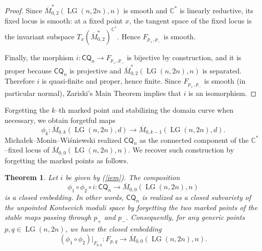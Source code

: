 \documentclass[10pt]{amsart}
\newtheorem{theorem}{Theorem}[section]
\theoremstyle{definition}
\newcommand{\C}{\mathbb{C}}
\newcommand{\Mbar}{\overline{M}}
\newcommand{\LG}{\operatorname{LG}}
\newcommand{\CQ}{\mathsf{CQ}}
\theoremstyle{plain} %
\begin{document}
\begin{proof}
Since $\overline{M}_{0,2}^*(\LG(n,2n), n)$ is smooth and $\C^*$ is linearly reductive, its fixed locus is smooth: at a fixed point $x$, the tangent space of the fixed locus is the invariant subspace $T_x(\overline{M}_{0,2}^*)^{\C^*}$.
Hence $F_{p_{+},p_{-}}$ is smooth.

Finally, the morphism $i\colon\CQ_n\to F_{p_{+},p_{-}}$ is bijective by construction, and it is proper because $\CQ_n$ is projective and $\overline{M}_{0,2}^*(\LG(n,2n), n)$ is separated.
Therefore $i$ is quasi-finite and proper, hence finite.
Since $F_{p_{+},p_{-}}$ is smooth (in particular normal), Zariski's Main Theorem implies that $i$ is an isomorphism.

\end{proof}



Forgetting the $k$--th marked point and stabilizing the domain curve when necessary, we obtain forgetful maps
\[
\phi_k \colon \Mbar_{0,k}(\LG(n,2n),d) \longrightarrow \Mbar_{0,k-1}(\LG(n,2n),d).
\]
Micha{\l}ek--Monin--Wi\'sniewski \cite[Corollary 3.11]{MMW21} realized $\CQ_n$
as the connected component of the $\mathbb C^*$--fixed locus of $\Mbar_{0,0}(\LG(n,2n),n)$. We recover such construction by forgetting the marked points as follows.
\begin{theorem}\label{thm:forgetful-iso-image}
Let $i$ be given by (\ref{iem}). The composition  \begin{equation}\label{12i}
\phi_1\circ\phi_2\circ i\colon \CQ_n\rightarrow\Mbar_{0,0}(\LG(n,2n),n)   
\end{equation}
is a closed embedding. In other words, $\CQ_n$ is realized as a closed subvariety of the unpointed Kontsevich moduli space by forgetting the two marked points of the stable maps passing through $p_+$ and $p_-$.  Consequently, for any generic points $p,q\in\LG(n,2n)$, we have the closed embedding
\[
(\phi_1\circ\phi_2)|_{F_{p,q}}\colon F_{p,q}\longrightarrow \Mbar_{0,0}(\LG(n,2n),n).
\]
\end{theorem}
\end{document}
